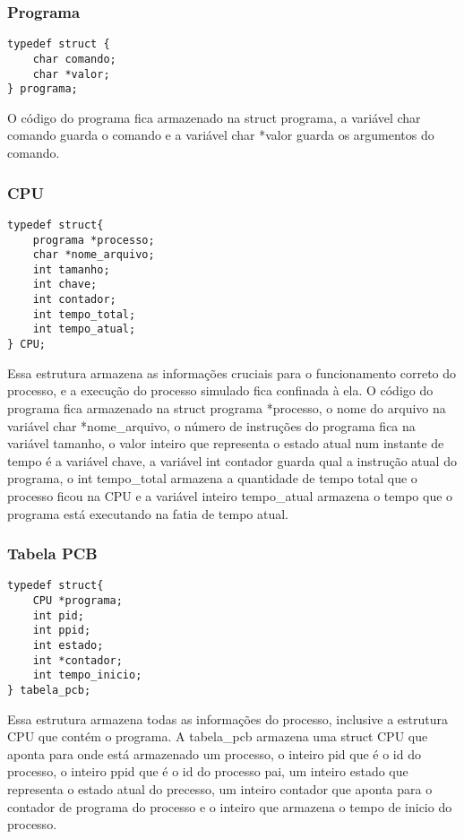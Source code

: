 \documentclass[a4paper, 12pt]{article}
\begin{document}
\subsubsection{Programa}
\begin{verbatim}
typedef struct {
    char comando;
    char *valor;
} programa;
\end{verbatim}
    O código do programa fica armazenado na struct programa, a variável char comando guarda o comando e a variável char *valor guarda os argumentos do comando.

    		
\subsubsection{CPU}
 \begin{verbatim}
typedef struct{
    programa *processo;
    char *nome_arquivo;
    int tamanho;
    int chave;
    int contador;
    int tempo_total;
    int tempo_atual;
} CPU;
\end{verbatim}
    Essa estrutura armazena as informações cruciais para o funcionamento correto do processo, e a execução do processo simulado fica confinada à ela. O código do programa fica armazenado na struct programa *processo, o nome do arquivo na variável char *nome\_arquivo, o número de instruções do programa fica na variável tamanho, o valor inteiro que representa o estado atual num instante de tempo é a variável chave, a variável int contador guarda qual a instrução atual do programa, o int tempo\_total armazena a quantidade de tempo total que o processo ficou na CPU e a variável inteiro tempo\_atual armazena o tempo que o programa está executando na fatia de tempo atual.
\newpage
\subsubsection{Tabela PCB}
\begin{verbatim}
typedef struct{
    CPU *programa;
    int pid;
    int ppid;
    int estado;
    int *contador;
    int tempo_inicio;
} tabela_pcb;
\end{verbatim}
    Essa estrutura armazena todas as informações do processo, inclusive a estrutura CPU que contém o programa. A tabela\_pcb armazena uma struct CPU que aponta para onde está armazenado um processo, o inteiro pid que é o id do processo, o inteiro ppid que é o id do processo pai, um inteiro estado que representa o estado atual do precesso, um inteiro contador que aponta para o contador de programa do processo e o inteiro que armazena o tempo de inicio do processo.
\end{document}
